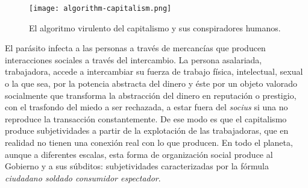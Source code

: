 \begin{figure}[htbp]
	\centering
	\texttt{[image: algorithm-capitalism.png]}
	\caption[El algoritmo virulento del capitalismo.]{El algoritmo virulento del capitalismo y sus conspiradores humanos.}
	\label{fig:algoritmo}
\end{figure}

El parásito infecta a las personas a través de mercancías que producen interacciones sociales a través del intercambio. La persona asalariada, trabajadora, accede a intercambiar su fuerza de trabajo física, intelectual, sexual o la que sea, por la potencia abstracta del dinero y éste por un objeto valorado socialmente que transforma la abstracción del dinero en reputación o prestigio, con el trasfondo del miedo a ser rechazada, a estar fuera del \emph{socius} si una no reproduce la transacción constantemente. De ese modo es que el capitalismo produce subjetividades a partir de la explotación de las trabajadoras, que en realidad no tienen una conexión real con lo que producen. En todo el planeta, aunque a diferentes escalas, esta forma de organización social produce al Gobierno y a sus súbditos: subjetividades caracterizadas por la fórmula \emph{ciudadano soldado consumidor espectador}.


